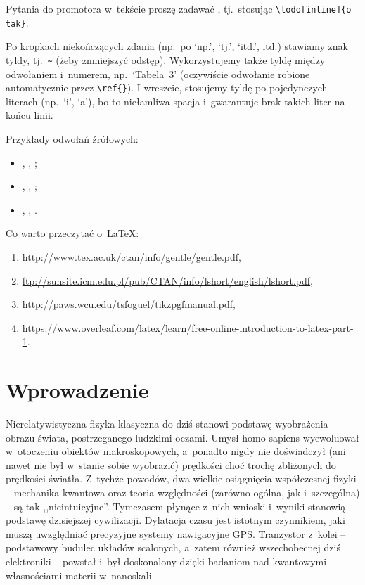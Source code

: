 \documentclass[12pt,a4paper,twoside,openany]{book}
\begin{document}
Pytania do promotora w~tekście proszę zadawać , tj.~stosując \verb!\todo[inline]{o tak}!.

Po kropkach niekończących zdania (np.~po `np.', `tj.', `itd.', itd.) stawiamy znak tyldy, tj.~\verb!~! (żeby zmniejszyć odstęp). Wykorzystujemy także tyldę między odwołaniem i~numerem, np.~`Tabela~3' (oczywiście odwołanie robione automatycznie przez \verb!\ref{}!). I wreszcie, stosujemy tyldę po pojedynczych literach (np.~`i', `a'), bo to niełamliwa spacja i~gwarantuje brak takich liter na końcu linii.

Przykłady odwołań źrółowych:
\begin{itemize}
\item \citep{dolan2000}, \citet{dolan2000}, ;
\item \citep{wakker1999}, \citet{wakker1999}, ;
\item \citep{drummond1997}, \citet{drummond1997}, .
\end{itemize}

Co warto przeczytać o~\LaTeX:
\begin{enumerate}
\footnotesize %
\item \url{http://www.tex.ac.uk/ctan/info/gentle/gentle.pdf},
\item \url{ftp://sunsite.icm.edu.pl/pub/CTAN/info/lshort/english/lshort.pdf},
\item \url{http://paws.wcu.edu/tsfoguel/tikzpgfmanual.pdf},
\item \url{https://www.overleaf.com/latex/learn/free-online-introduction-to-latex-part-1}.
\end{enumerate}

\chapter*{Wprowadzenie}

Nierelatywistyczna fizyka klasyczna do dziś stanowi podstawę wyobrażenia obrazu świata, postrzeganego ludzkimi oczami. 
Umysł homo sapiens wyewoluował w~otoczeniu obiektów makroskopowych, a~ponadto nigdy nie doświadczył (ani nawet nie był w~stanie sobie wyobrazić) prędkości choć trochę zbliżonych do prędkości światła. 
Z~tychże powodów, dwa wielkie osiągnięcia współczesnej fizyki – mechanika kwantowa oraz teoria względności (zarówno ogólna, jak i~szczególna) – są tak ,,nieintuicyjne''. 
Tymczasem płynące z~nich wnioski i~wyniki stanowią podstawę dzisiejszej cywilizacji. 
Dylatacja czasu jest istotnym czynnikiem, jaki muszą uwzględniać precyzyjne systemy nawigacyjne GPS. 
Tranzystor z~kolei – podstawowy budulec układów scalonych, a~zatem również wszechobecnej dziś elektroniki – powstał i~był doskonalony dzięki badaniom nad kwantowymi własnościami materii w~nanoskali.
\end{document}
